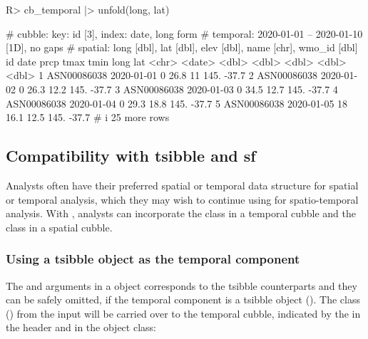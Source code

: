 \documentclass[
  shortnames]{jss}
\begin{document}
\begin{CodeChunk}
\begin{CodeInput}
R> cb_temporal |> unfold(long, lat)
\end{CodeInput}
\begin{CodeOutput}
# cubble:   key: id [3], index: date, long form
# temporal: 2020-01-01 -- 2020-01-10 [1D], no gaps
# spatial:  long [dbl], lat [dbl], elev [dbl], name [chr], wmo_id [dbl]
  id          date        prcp  tmax  tmin  long   lat
  <chr>       <date>     <dbl> <dbl> <dbl> <dbl> <dbl>
1 ASN00086038 2020-01-01     0  26.8  11    145. -37.7
2 ASN00086038 2020-01-02     0  26.3  12.2  145. -37.7
3 ASN00086038 2020-01-03     0  34.5  12.7  145. -37.7
4 ASN00086038 2020-01-04     0  29.3  18.8  145. -37.7
5 ASN00086038 2020-01-05    18  16.1  12.5  145. -37.7
# i 25 more rows
\end{CodeOutput}
\end{CodeChunk}

\hypertarget{compatibility-with-tsibble-and-sf}{%
\subsection{Compatibility with tsibble and sf}\label{compatibility-with-tsibble-and-sf}}

Analysts often have their preferred spatial or temporal data structure for spatial or temporal analysis, which they may wish to continue using for spatio-temporal analysis. With , analysts can incorporate the  class in a temporal cubble and the  class in a spatial cubble.

\hypertarget{using-a-tsibble-object-as-the-temporal-component}{%
\subsubsection{Using a tsibble object as the temporal component}\label{using-a-tsibble-object-as-the-temporal-component}}

The  and  arguments in a  object corresponds to the tsibble counterparts and they can be safely omitted, if the temporal component is a tsibble object (). The  class () from the input will be carried over to the temporal cubble, indicated by the \code{[tsibble]} in the header and in the object class:
\end{document}
